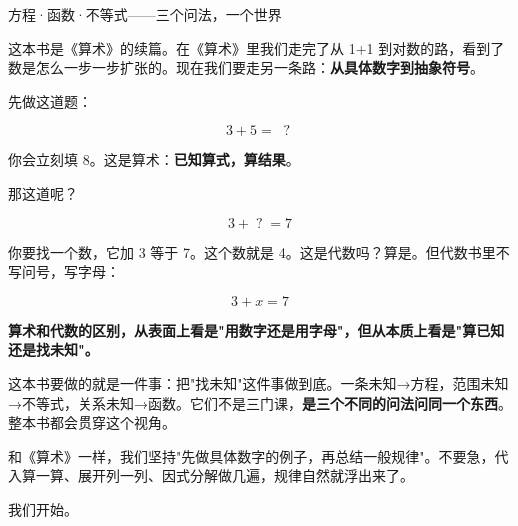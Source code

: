 \documentclass[a4paper,12pt]{ctexart}
\begin{document}
\pagestyle{empty}

\begin{center}
  \large 方程·函数·不等式——三个问法，一个世界
\end{center}
\vspace{0.3cm}


这本书是《算术》的续篇。在《算术》里我们走完了从 1+1 到对数的路，看到了数是怎么一步一步扩张的。现在我们要走另一条路：\textbf{从具体数字到抽象符号}。

先做这道题：

\[
3 + 5 = \;\boxed{\;?\;}
\]

你会立刻填 8。这是算术：\textbf{已知算式，算结果}。

那这道呢？

\[
3 + \boxed{\;?\;} = 7
\]

你要找一个数，它加 3 等于 7。这个数就是 4。这是代数吗？算是。但代数书里不写问号，写字母：

\[
3 + x = 7
\]

\textbf{算术和代数的区别，从表面上看是"用数字还是用字母"，但从本质上看是"算已知还是找未知"。}

这本书要做的就是一件事：把"找未知"这件事做到底。一条未知→方程，范围未知→不等式，关系未知→函数。它们不是三门课，\textbf{是三个不同的问法问同一个东西}。整本书都会贯穿这个视角。

和《算术》一样，我们坚持"先做具体数字的例子，再总结一般规律"。不要急，代入算一算、展开列一列、因式分解做几遍，规律自然就浮出来了。

我们开始。

\newpage

\pagestyle{fancy}
\tableofcontents
\newpage









\newpage

\end{document}
